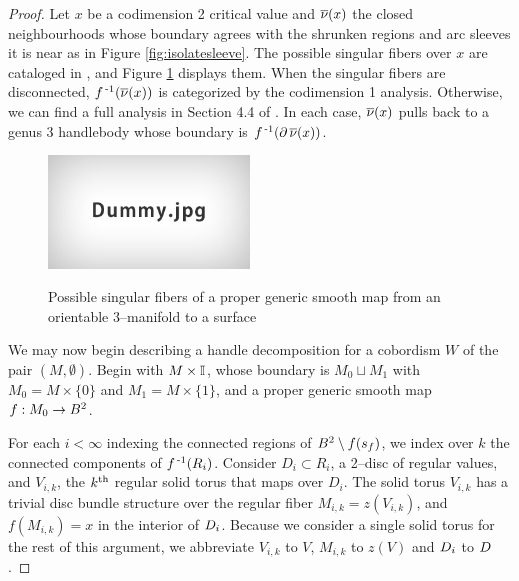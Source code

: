 \begin{proof}
	Let $x$ be a codimension 2 critical value and $\overline{\nu}(x)$ the closed neighbourhoods whose boundary agrees with the shrunken regions and arc sleeves it is near as in Figure \ref{fig:isolatesleeve}.
	The possible singular fibers over $x$ are cataloged in \cite{Saeki}, and Figure \ref{fig:saekising} displays them.
	When the singular fibers are disconnected, $f^{\,\text{-}1}(\overline{\nu}(x))$ is categorized by the codimension 1 analysis.
	Otherwise, we can find a full analysis in Section 4.4 of \cite{CostThur08}.
	In each case, $\overline{\nu}(x)$ pulls back to a genus 3 handlebody whose boundary is $f^{\,\text{-}1}(\partial\,\overline{\nu}(x))$.
	
	\begin{figure}
		\centering
		\captionsetup{justification=centering}
		\caption{Possible singular fibers of a proper generic smooth map from an orientable 3--manifold to a surface}
		\includegraphics[height=3cm]{figures/dummy.jpg}
		\label{fig:saekising}
	\end{figure}
	
	We may now begin describing a handle decomposition for a cobordism $W$ of the pair $(M,\emptyset)$.
	Begin with $M\times\mathbb{I}$, whose boundary is $M_0\sqcup M_1$ with $M_0=M\times\{0\}$ and $M_1 = M\times\{1\}$, and a proper generic smooth map $f:M_0\to B^2$.

	For each $i<\infty$ indexing the connected regions of $B^2\setminus f(s_f)$, we index over $k$ the connected components of $f^{\,\text{-}1}(R_i)$.
	Consider $D_i\subset R_i$, a 2--disc of regular values, and $V_{i,k}$, the $k^{\text{th}}$ regular solid torus that maps over $D_i$.
	The solid torus $V_{i,k}$ has a trivial disc bundle structure over the regular fiber $M_{i,k}=z(V_{i,k})$, and $f(M_{i,k})=x$ in the interior of $D_i$.
	Because we consider a single solid torus for the rest of this argument, we abbreviate $V_{i,k}$ to $V$, $M_{i,k}$ to $z(V)$ and $D_i$ to $D$.


\end{proof}
